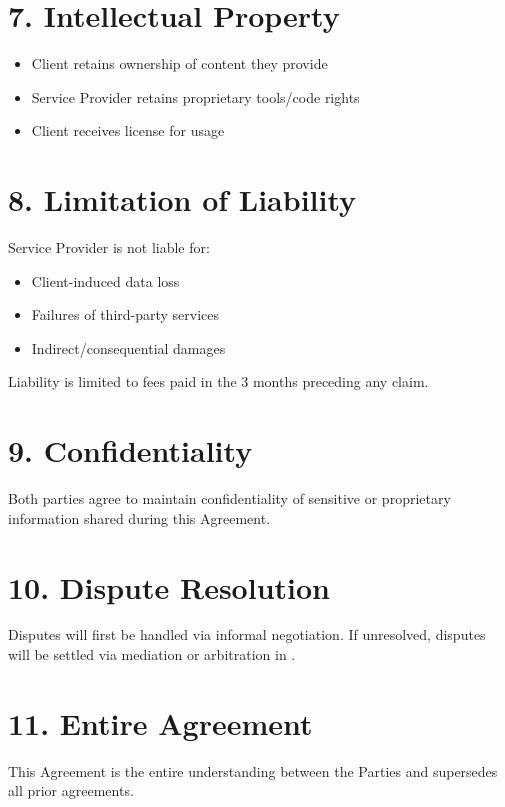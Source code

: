 \documentclass[12pt]{article}
\begin{document}
\section*{7. Intellectual Property}
\begin{itemize}[noitemsep]
    \item Client retains ownership of content they provide
    \item Service Provider retains proprietary tools/code rights
    \item Client receives license for usage
\end{itemize}

\section*{8. Limitation of Liability}
Service Provider is not liable for:
\begin{itemize}[noitemsep]
    \item Client-induced data loss
    \item Failures of third-party services
    \item Indirect/consequential damages
\end{itemize}

Liability is limited to fees paid in the 3 months preceding any claim.

\section*{9. Confidentiality}
Both parties agree to maintain confidentiality of sensitive or proprietary information shared during this Agreement.

\section*{10. Dispute Resolution}
Disputes will first be handled via informal negotiation. If unresolved, disputes will be settled via mediation or arbitration in \underline{\hspace{4cm}}.

\section*{11. Entire Agreement}
This Agreement is the entire understanding between the Parties and supersedes all prior agreements.

\vspace{2cm}
\end{document}
